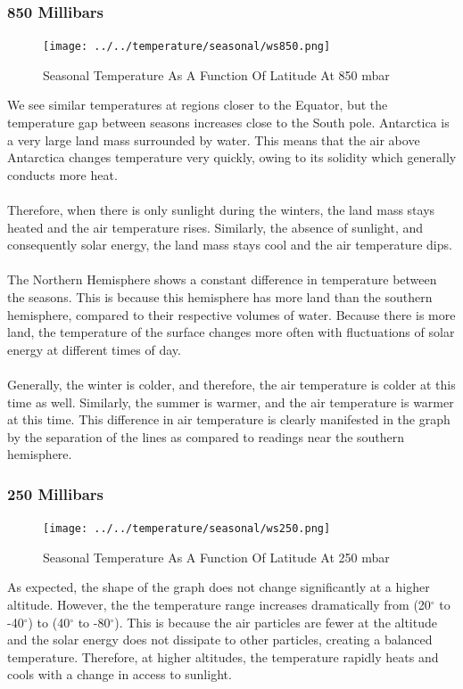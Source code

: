 \documentclass[hidelinks]{article}
\begin{document}
\subsubsection{850 Millibars}
\begin{figure}[h!]
	\centering
	\texttt{[image: ../../temperature/seasonal/ws850.png]}
	\caption{Seasonal Temperature As A Function Of Latitude At 850 mbar}
\end{figure}
\noindent We see similar temperatures at regions closer to the Equator, but the temperature gap between seasons increases close to the South pole. Antarctica is a very large land mass surrounded by water. This means that the air above Antarctica changes temperature very quickly, owing to its solidity which generally conducts more heat. 
\\\\
Therefore, when there is only sunlight during the winters, the land mass stays heated and the air temperature rises. Similarly, the absence of sunlight, and consequently solar energy, the land mass stays cool and the air temperature dips.
\\\\
The Northern Hemisphere shows a constant difference in temperature between the seasons. This is because this hemisphere has more land than the southern hemisphere, compared to their respective volumes of water. Because there is more land, the temperature of the surface changes more often with fluctuations of solar energy at different times of day. 
\\\\
Generally, the winter is colder, and therefore, the air temperature is colder at this time as well. Similarly, the summer is warmer, and the air temperature is warmer at this time. This difference in air temperature is clearly manifested in the graph by the separation of the lines as compared to readings near the southern hemisphere.
\newpage
\subsubsection{250 Millibars}
\begin{figure}[h!]
	\centering
	\texttt{[image: ../../temperature/seasonal/ws250.png]}
	\caption{Seasonal Temperature As A Function Of Latitude At 250 mbar}
\end{figure}
\noindent As expected, the shape of the graph does not change significantly at a higher altitude. However, the the temperature range increases dramatically from (20$^\circ$ to -40$^\circ$) to (40$^\circ$ to -80$^\circ$). This is because the air particles are fewer at the altitude and the solar energy does not dissipate to other particles, creating a balanced temperature. Therefore, at higher altitudes, the temperature rapidly heats and cools with a change in access to sunlight.
\end{document}
